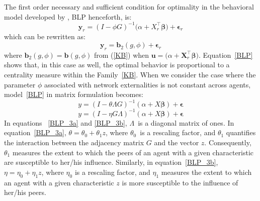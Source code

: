 \documentclass[nojss]{jss}
\begin{document}
The first order necessary and sufficient condition for optimality in the behavioral model developed by \cite{Battaglini+Sciabolazza+Patacchini:2018}, BLP henceforth, is: 
\begin{equation}
\mathbf{y}_{r}=\left(I-\phi G\right) ^{-1}(\alpha
+X_{r}^\top\mathbf{\beta )}+\mathbf{\epsilon }_{r}
\label{BLP0}
\end{equation}
which can be rewritten as:
\begin{equation}
\mathbf{y}_{r}=\boldsymbol{b}_{2}\left( g,\phi \right)+\mathbf{\epsilon}_{r}  
\label{BLP}
\end{equation}
where $\boldsymbol{b}_{2}\left( g,\phi \right) =\boldsymbol{b}\left( g,\phi
\right) $ from (\ref{KB}) when $\boldsymbol{u}=(\alpha +\boldsymbol{X}_{r}^\top\mathbf{\beta)}$. Equation~\ref{BLP} shows that, in this case as well, the optimal behavior is proportional to a centrality measure within the Family~\ref{KB}.
When we consider the case where the parameter $\phi$ associated with network externalities is not constant across agents, model~\ref{BLP} in matrix formulation becomes:
\begin{equation}
y=(I-\theta \Lambda G)^{-1}(\alpha +X\mathbf{\beta })+\mathbf{\epsilon}
\label{BLP_3a}
\end{equation}
\begin{equation}
y=(I-\eta G\Lambda)^{-1}(\alpha +X\mathbf{\beta })+\mathbf{\epsilon}
\label{BLP_3b}
\end{equation}
In equations ~\ref{BLP_3a} and \ref{BLP_3b}, $\Lambda $\ is a diagonal matrix of ones. In equation~\ref{BLP_3a}, $\theta =\theta _{0}+\theta _{1}z$, where $\theta _{0}$\ is a rescaling factor, and $\theta _{1}$ quantifies the interaction between the adjacency matrix $G$ and the vector $z$. Consequently, $\theta _{1}$ measures the extent to which the peers of an agent with a given characteristic are susceptible to her/his influence. Similarly, in equation~\ref{BLP_3b}, $\eta =\eta _{0}+\eta _{1}z$, where $\eta _{0}$ is a rescaling factor, and $\eta _{1}$ measures the extent to which an agent with a given characteristic $z$ is more susceptible to the influence of her/his peers.
\end{document}
